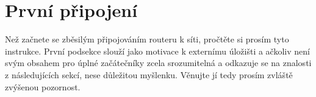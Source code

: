 \section{První připojení}
Než začnete se zběsilým připojováním routeru k síti, pročtěte si prosím tyto
instrukce. První podsekce slouží jako motivace k externímu úložišti a ačkoliv
není svým obsahem pro úplné začátečníky zcela srozumitelná a odkazuje se na
znalosti z následujících sekcí, nese důležitou
myšlenku. Věnujte jí tedy prosím zvláště zvýšenou pozornost.






